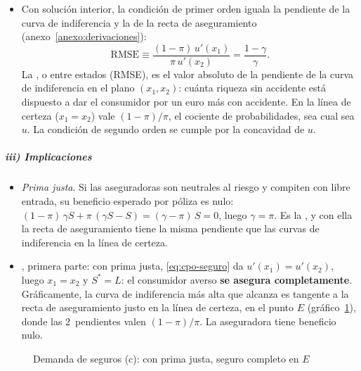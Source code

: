 \documentclass[11pt]{article}
\begin{document}
\begin{itemize}
\item[] Con solución interior, la condición de primer orden iguala la pendiente de la curva de indiferencia y la de la recta de aseguramiento (anexo~\ref{anexo:derivaciones}):
  \begin{equation}\label{eq:cpo-seguro}
  \mathrm{RMSE}\equiv\frac{(1-\pi)\,u'(x_1)}{\pi\,u'(x_2)}=\frac{1-\gamma}{\gamma} .
  \end{equation}
  La , o entre estados (RMSE), es el valor absoluto de la pendiente de la curva de indiferencia en el plano $(x_1,x_2)$: cuánta riqueza sin accidente está dispuesto a dar el consumidor por un euro más con accidente. En la línea de certeza ($x_1=x_2$) vale $(1-\pi)/\pi$, el cociente de probabilidades, sea cual sea $u$. La condición de segundo orden se cumple por la concavidad de $u$.
\end{itemize}

\subparagraph{iii) Implicaciones}

\begin{itemize}
\item \emph{Prima justa}. Si las aseguradoras son neutrales al riesgo y compiten con libre entrada, su beneficio esperado por póliza es nulo: $(1-\pi)\,\gamma S+\pi\,(\gamma S-S)=(\gamma-\pi)\,S=0$, luego $\gamma=\pi$. Es la , y con ella la recta de aseguramiento tiene la misma pendiente que las curvas de indiferencia en la línea de certeza.
\item {}, primera parte: con prima justa, \eqref{eq:cpo-seguro} da $u'(x_1)=u'(x_2)$, luego $x_1=x_2$ y $S^*=L$: el consumidor averso \textbf{se asegura completamente}. Gráficamente, la curva de indiferencia más alta que alcanza es tangente a la recta de aseguramiento justo en la línea de certeza, en el punto $E$ (gráfico~\ref{fig:seguros-c}), donde las 2~pendientes valen $(1-\pi)/\pi$. La aseguradora tiene beneficio nulo.
\end{itemize}

\begin{figure}[H]
\centering
\caption{Demanda de seguros (c): con prima justa, seguro completo en $E$}\label{fig:seguros-c}
\end{figure}
\end{document}
